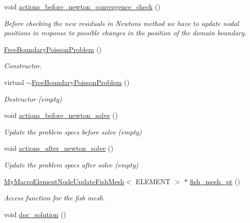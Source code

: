 \begin{DoxyCompactItemize}
void \hyperlink{classFreeBoundaryPoissonProblem_a885a6e3a4efd1f02314806dced566569}{actions\+\_\+before\+\_\+newton\+\_\+convergence\+\_\+check} ()
\begin{DoxyCompactList}\small\item\em Before checking the new residuals in Newton\textquotesingle{}s method we have to update nodal positions in response to possible changes in the position of the domain boundary. \end{DoxyCompactList}\item 
\hyperlink{classFreeBoundaryPoissonProblem_a0efe7c342eea790fc0240830bc3c4ebc}{Free\+Boundary\+Poisson\+Problem} ()
\begin{DoxyCompactList}\small\item\em Constructor. \end{DoxyCompactList}\item 
virtual \hyperlink{classFreeBoundaryPoissonProblem_a5b75b8553f3dfed4e9a8996c1b13edf3}{$\sim$\+Free\+Boundary\+Poisson\+Problem} ()
\begin{DoxyCompactList}\small\item\em Destructor (empty) \end{DoxyCompactList}\item 
void \hyperlink{classFreeBoundaryPoissonProblem_aeef57bd5dc79b6aba9eeadcd0c01a2e0}{actions\+\_\+before\+\_\+newton\+\_\+solve} ()
\begin{DoxyCompactList}\small\item\em Update the problem specs before solve (empty) \end{DoxyCompactList}\item 
void \hyperlink{classFreeBoundaryPoissonProblem_aa18df6c9a9287f67ae1bff0f67aaa625}{actions\+\_\+after\+\_\+newton\+\_\+solve} ()
\begin{DoxyCompactList}\small\item\em Update the problem specs after solve (empty) \end{DoxyCompactList}\item 
\hyperlink{classMyMacroElementNodeUpdateFishMesh}{My\+Macro\+Element\+Node\+Update\+Fish\+Mesh}$<$ E\+L\+E\+M\+E\+NT $>$ $\ast$ \hyperlink{classFreeBoundaryPoissonProblem_a2e5bc4d52a7d8feefc2aafae0fd29bab}{fish\+\_\+mesh\+\_\+pt} ()
\begin{DoxyCompactList}\small\item\em Access function for the fish mesh. \end{DoxyCompactList}\item 
void \hyperlink{classFreeBoundaryPoissonProblem_a2282d8ac1d5753771a9a3cfc0417f6b6}{doc\+\_\+solution} ()

\end{DoxyCompactItemize}
